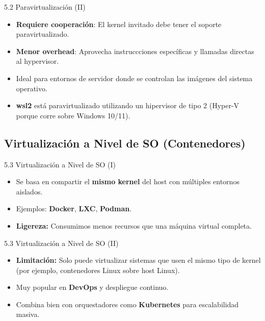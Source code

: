 \documentclass{beamer}
\begin{document}
\begin{frame}{5.2 Paravirtualización (II)}
	\begin{itemize}
		\item \textbf{Requiere cooperación}: El kernel invitado debe tener el soporte paravirtualizado.
		\item \textbf{Menor overhead}: Aprovecha instruccciones específicas y llamadas directas al hypervisor.
		\item Ideal para entornos de servidor donde se controlan las imágenes del sistema operativo.
		\item \textbf{wsl2} está paravirtualizado utilizando un hipervisor de tipo 2 (Hyper-V porque corre sobre Windows 10/11).
	\end{itemize}
\end{frame}

\subsection{Virtualización a Nivel de SO (Contenedores)}
\begin{frame}{5.3 Virtualización a Nivel de SO (I)}
	\begin{itemize}
		\item Se basa en compartir el \textbf{mismo kernel} del host con múltiples entornos aislados.
		\item Ejemplos: \textbf{Docker}, \textbf{LXC}, \textbf{Podman}.
		\item \textbf{Ligereza:} Consumimos menos recursos que una máquina virtual completa.
	\end{itemize}
\end{frame}

\begin{frame}{5.3 Virtualización a Nivel de SO (II)}
	\begin{itemize}
		\item \textbf{Limitación:} Solo puede virtualizar sistemas que usen el mismo tipo de kernel (por ejemplo, contenedores Linux sobre host Linux).
		\item Muy popular en \textbf{DevOps} y despliegue continuo.
		\item Combina bien con orquestadores como \textbf{Kubernetes} para escalabilidad masiva.
	\end{itemize}
\end{frame}

\end{document}
